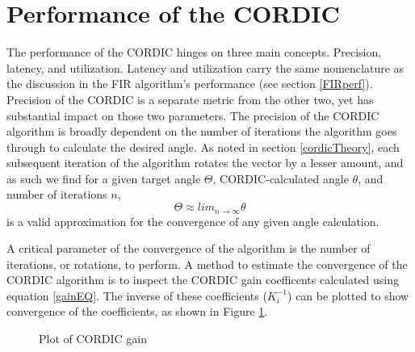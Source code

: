 \documentclass[../report_polarFIR.tex]{subfiles}
\begin{document}
\section{Performance of the CORDIC}

The performance of the CORDIC hinges on three main concepts. Precision, latency, and utilization. Latency and utilization carry the same nomenclature as the discussion in the FIR algorithm's performance (see section \ref{FIRperf}). Precision of the CORDIC is a separate metric from the other two, yet has substantial impact on those two parameters. The precision of the CORDIC algorithm is broadly dependent on the number of iterations the algorithm goes through to calculate the desired angle. As noted in section \ref{cordicTheory}, each subsequent iteration of the algorithm rotates the vector by a lesser amount, and as such we find for a given target angle $\Theta$, CORDIC-calculated angle $\theta$, and number of iterations $n$, 
\begin{equation}
	\Theta \approx lim_{n \rightarrow \infty} \theta
\end{equation}
is a valid approximation for the convergence of any given angle calculation.

A critical parameter of the convergence of the algorithm is the number of iterations, or rotations, to perform. A method to estimate the convergence of the CORDIC algorithm is to inspect the CORDIC gain coefficents calculated using equation \ref{gainEQ}. The inverse of these coefficients ($K_i ^{-1}$) can be plotted to show convergence of the coefficients, as shown in Figure \ref{CORDICcoeffPlot}.

\begin{figure}[h!]
\begin{center}
\label{CORDICcoeffPlot}

   
   \caption{Plot of CORDIC gain}
   
\end{center}

\end{figure}
\FloatBarrier
\end{document}
